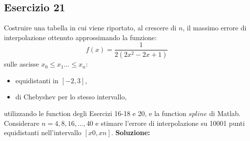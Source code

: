 \subsection{Esercizio 21}
Costruire una tabella in cui viene riportato, al crescere di $n$, il massimo errore di
interpolazione ottenuto approssimando la funzione:
\[
    f(x) = \frac{1}{2(2x^2-2x+1)}
\]
sulle ascisse $x_0 \le x_1 \dots \le x_n$:
\begin{itemize}
    \item equidistanti in $[-2, 3]$,
    \item di Chebyshev per lo stesso intervallo,
\end{itemize}
utilizzando le function degli Esercizi 16-18 e 20, e la function $spline$ di Matlab. Considerare
$n = 4, 8, 16, \dots, 40$ e stimare l'errore di interpolazione su 10001 punti
equidistanti nell'intervallo $[x0, xn]$.
\newline \textbf{Soluzione:}

